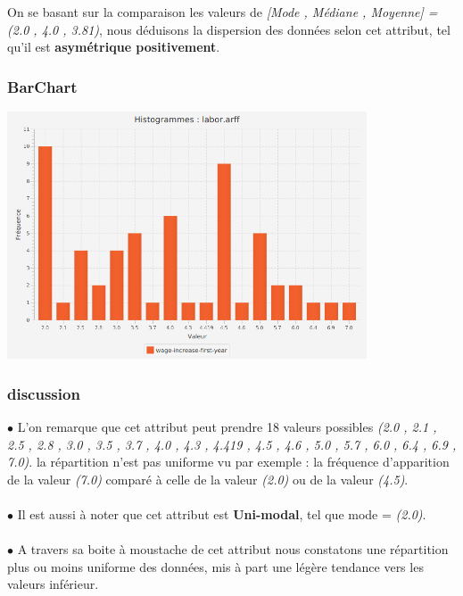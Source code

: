 \documentclass[12pt,a4paper,oneside]{book}
\begin{document}
	On se basant sur la comparaison les valeurs de \textit{[Mode , Médiane , Moyenne] = (2.0 , 4.0 , 3.81)}, nous déduisons la dispersion des données selon cet attribut, tel qu'il est \textbf{asymétrique positivement}.
	
	\subsubsection{BarChart}
	
	\begin{center}
		\includegraphics[width=0.8\textwidth]{screens/barchart/wage-increase-first-year-barchart.png}%
		\label{labelname}%
	\end{center}
	
	\subsubsection{discussion}							
	$\bullet $ L'on remarque que cet attribut peut prendre 18 valeurs possibles \textit{(2.0 , 2.1 , 2.5 , 2.8 , 3.0 , 3.5 , 3.7 , 4.0 , 4.3 , 4.419 , 4.5 , 4.6 , 5.0 , 5.7 , 6.0 , 6.4 , 6.9 , 7.0)}. la répartition n'est pas uniforme vu par exemple : la fréquence d'apparition de la valeur \textit{(7.0)} comparé à celle de la valeur \textit{(2.0)} ou de la valeur \textit{(4.5)}.\\
	\textbf{ }\\
	$\bullet $ Il est aussi à noter que cet attribut est \textbf{Uni-modal}, tel que mode = \textit{(2.0)}.\\
	\textbf{ }\\
	$\bullet $ A travers sa boite à moustache de cet attribut nous constatons une répartition plus ou moins uniforme des données, mis à part une légère tendance vers les valeurs inférieur.
	
\end{document}
